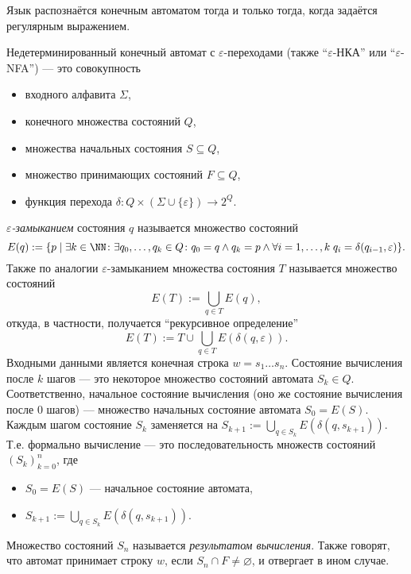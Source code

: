 \documentclass[12pt,a4paper]{article}
\begin{document}
    \begin{theorem}
        Язык распознаётся конечным автоматом тогда и только тогда, когда задаётся регулярным выражением.
    \end{theorem}

    \begin{definition}
        Недетерминированный конечный автомат с $\varepsilon$-переходами (также ``$\varepsilon$-НКА'' или ``$\varepsilon$-NFA'') --- это совокупность
        \begin{itemize}
            \item входного алфавита $\Sigma$,
            \item конечного множества состояний $Q$,
            \item множества начальных состояния $S \subseteq Q$,
            \item множество принимающих состояний $F \subseteq Q$,
            \item функция перехода $\delta: Q \times (\Sigma \cup \{\varepsilon\}) \to 2^Q$.
        \end{itemize}
        \emph{$\varepsilon$-замыканием} состояния $q$ называется множество состояний
        \[E(q) := \{p \mid \exists k \in \NN\colon \exists q_0, \dots, q_k \in Q\colon q_0 = q \wedge q_k = p \wedge \forall i = 1, \dots, k\; q_i = \delta(q_{i-1}, \varepsilon)\}.\]
        Также по аналогии $\varepsilon$-замыканием множества состояния $T$ называется множество состояний
        \[E(T) := \bigcup_{q \in T} E(q),\]
        откуда, в частности, получается ``рекурсивное определение''
        \[E(T) := T \cup \bigcup_{q \in T} E(\delta(q, \varepsilon)).\]
        Входными данными является конечная строка $w = s_1 \dots s_n$. Состояние вычисления после $k$ шагов --- это некоторое множество состояний автомата $S_k \in Q$. Соответственно, начальное состояние вычисления (оно же состояние вычисления после $0$ шагов) --- множество начальных состояние автомата $S_0 = E(S)$. Каждым шагом состояние $S_k$ заменяется на $S_{k+1} := \bigcup_{q \in S_k} E(\delta(q, s_{k+1}))$. Т.е. формально вычисление --- это последовательность множеств состояний $(S_k)_{k=0}^n$, где
        \begin{itemize}
            \item $S_0 = E(S)$ --- начальное состояние автомата,
            \item $S_{k+1} := \bigcup_{q \in S_k} E(\delta(q, s_{k+1}))$.
        \end{itemize}
        Множество состояний $S_n$ называется \emph{результатом вычисления}. Также говорят, что автомат принимает строку $w$, если $S_n \cap F \neq \varnothing$, и отвергает в ином случае.


\end{definition}
\end{document}
